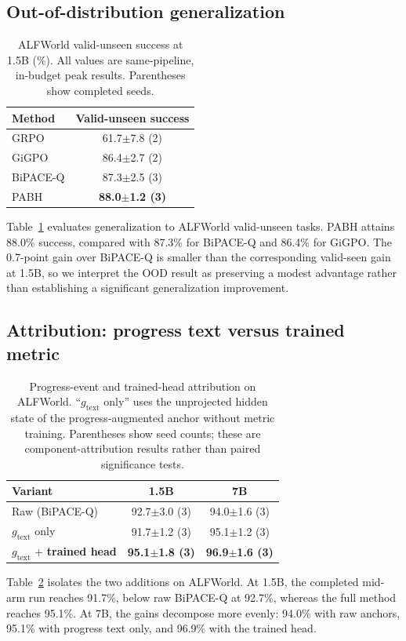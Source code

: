 \documentclass[10pt,twocolumn,letterpaper]{article}
\newcommand{\method}{PABH\xspace}
\begin{document}
\subsection{Out-of-distribution generalization}
\label{sec:ood}
\begin{table}[htbp]
\centering
\caption{ALFWorld valid-unseen success at 1.5B (\%). All values are same-pipeline, in-budget peak results. Parentheses show completed seeds.}
\label{tab:ood}
\small
\setlength{\tabcolsep}{7.0pt}
\begin{tabular}{@{}lc@{}}
\toprule
Method & Valid-unseen success \\
\midrule
GRPO & 61.7$\pm$7.8 (2) \\
GiGPO & 86.4$\pm$2.7 (2) \\
BiPACE-Q & 87.3$\pm$2.5 (3) \\
\method & \textbf{88.0$\pm$1.2 (3)} \\
\bottomrule
\end{tabular}
\end{table}
Table~\ref{tab:ood} evaluates generalization to ALFWorld valid-unseen tasks. \method attains 88.0\% success, compared with 87.3\% for BiPACE-Q and 86.4\% for GiGPO. The 0.7-point gain over BiPACE-Q is smaller than the corresponding valid-seen gain at 1.5B, so we interpret the OOD result as preserving a modest advantage rather than establishing a significant generalization improvement.

\subsection{Attribution: progress text versus trained metric}
\label{sec:attrib}
\begin{table}[htbp]
\centering
\caption{Progress-event and trained-head attribution on ALFWorld. ``$g_{\mathrm{text}}$ only'' uses the unprojected hidden state of the progress-augmented anchor without metric training. Parentheses show seed counts; these are component-attribution results rather than paired significance tests.}
\label{tab:attrib}
\small
\setlength{\tabcolsep}{5.0pt}
\begin{tabular}{@{}lcc@{}}
\toprule
Variant & 1.5B & 7B \\
\midrule
Raw (BiPACE-Q) & 92.7$\pm$3.0 (3) & 94.0$\pm$1.6 (3) \\
$g_{\mathrm{text}}$ only & 91.7$\pm$1.2 (3) & 95.1$\pm$1.2 (3) \\
$g_{\mathrm{text}}$ + \textbf{trained head} & \textbf{95.1$\pm$1.8 (3)} & \textbf{96.9$\pm$1.6 (3)} \\
\bottomrule
\end{tabular}
\end{table}
Table~\ref{tab:attrib} isolates the two additions on ALFWorld. At 1.5B, the completed mid-arm run reaches 91.7\%, below raw BiPACE-Q at 92.7\%, whereas the full method reaches 95.1\%. At 7B, the gains decompose more evenly: 94.0\% with raw anchors, 95.1\% with progress text only, and 96.9\% with the trained head.
\end{document}
